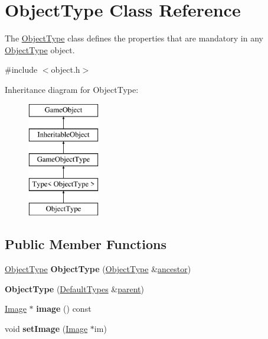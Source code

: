 \hypertarget{class_object_type}{\section{\-Object\-Type \-Class \-Reference}
\label{class_object_type}
}


\-The \hyperlink{class_object_type}{\-Object\-Type} class defines the properties that are mandatory in any \hyperlink{class_object_type}{\-Object\-Type} object.  




{\ttfamily \#include $<$object.\-h$>$}

\-Inheritance diagram for \-Object\-Type\-:\begin{figure}[H]
\begin{center}
\leavevmode
\includegraphics[height=5.000000cm]{class_object_type}
\end{center}
\end{figure}
\subsection*{\-Public \-Member \-Functions}
\begin{DoxyCompactItemize}
\item 
\hypertarget{class_object_type_a331d8b3f8f0cefa4c1806d5005ab39fb}{\hyperlink{class_object_type}{\-Object\-Type} {\bfseries \-Object\-Type} (\hyperlink{class_object_type}{\-Object\-Type} \&\hyperlink{class_inheritable_object_a10eead70368227b7f15f44f91d234fa5}{ancestor})}\label{class_object_type_a331d8b3f8f0cefa4c1806d5005ab39fb}

\item 
\hypertarget{class_object_type_ab0c8f836fb9a204d6a8c5fc430988135}{{\bfseries \-Object\-Type} (\hyperlink{class_default_types}{\-Default\-Types} \&\hyperlink{class_game_object_af3deaf39cde23c189765634e32e95bb4}{parent})}\label{class_object_type_ab0c8f836fb9a204d6a8c5fc430988135}

\item 
\hypertarget{class_object_type_ad69430f792b80dc4dbbf52e42a956fb1}{\hyperlink{class_image}{\-Image} $\ast$ {\bfseries image} () const }\label{class_object_type_ad69430f792b80dc4dbbf52e42a956fb1}

\item 
\hypertarget{class_object_type_a645e1893d343dc9ba1a9c667cc6f0d36}{void {\bfseries set\-Image} (\hyperlink{class_image}{\-Image} $\ast$im)}\label{class_object_type_a645e1893d343dc9ba1a9c667cc6f0d36}

\end{DoxyCompactItemize}


